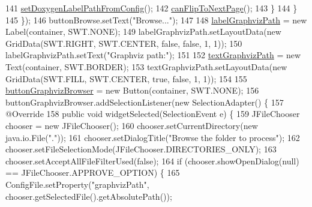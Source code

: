 \begin{DoxyCode}
141                     \hyperlink{classit_1_1isislab_1_1masonassisteddocumentation_1_1mason_1_1wizards_1_1_b___project_information_page_ad0acda6e90aee0af403c3e9c53525b5d}{setDoxygenLabelPathFromConfig}();
142                     \hyperlink{classit_1_1isislab_1_1masonassisteddocumentation_1_1mason_1_1wizards_1_1_b___project_information_page_a4ad2c0b1269d22b81ffc9e77f399c6af}{canFlipToNextPage}();
143                 \}
144             \}
145         \});
146         buttonBrowse.setText(\textcolor{stringliteral}{"Browse..."});
147         
148         \hyperlink{classit_1_1isislab_1_1masonassisteddocumentation_1_1mason_1_1wizards_1_1_b___project_information_page_acb48412dbb797258e13404c757c8d3f4}{labelGraphvizPath} = \textcolor{keyword}{new} Label(container, SWT.NONE);
149         labelGraphvizPath.setLayoutData(\textcolor{keyword}{new} GridData(SWT.RIGHT, SWT.CENTER, \textcolor{keyword}{false}, \textcolor{keyword}{false}, 1, 1));
150         labelGraphvizPath.setText(\textcolor{stringliteral}{"Graphviz path:"});
151         
152         \hyperlink{classit_1_1isislab_1_1masonassisteddocumentation_1_1mason_1_1wizards_1_1_b___project_information_page_a03d43e1fbcdb5d7d5e6745d8f57db84b}{textGraphvizPath} = \textcolor{keyword}{new} Text(container, SWT.BORDER);
153         textGraphvizPath.setLayoutData(\textcolor{keyword}{new} GridData(SWT.FILL, SWT.CENTER, \textcolor{keyword}{true}, \textcolor{keyword}{false}, 1, 1));
154         
155         \hyperlink{classit_1_1isislab_1_1masonassisteddocumentation_1_1mason_1_1wizards_1_1_b___project_information_page_ad5db74dd5c7fc084f538fde88d57573a}{buttonGraphvizBrowser} = \textcolor{keyword}{new} Button(container, SWT.NONE);
156         buttonGraphvizBrowser.addSelectionListener(\textcolor{keyword}{new} SelectionAdapter() \{
157             @Override
158             \textcolor{keyword}{public} \textcolor{keywordtype}{void} widgetSelected(SelectionEvent e) \{
159                 JFileChooser chooser = \textcolor{keyword}{new} JFileChooser();
160                 chooser.setCurrentDirectory(\textcolor{keyword}{new} java.io.File(\textcolor{stringliteral}{"."}));
161                 chooser.setDialogTitle(\textcolor{stringliteral}{"Browse the folder to process"});
162                 chooser.setFileSelectionMode(JFileChooser.DIRECTORIES\_ONLY);
163                 chooser.setAcceptAllFileFilterUsed(\textcolor{keyword}{false});
164                 \textcolor{keywordflow}{if} (chooser.showOpenDialog(null) == JFileChooser.APPROVE\_OPTION) \{                  
165                     ConfigFile.setProperty(\textcolor{stringliteral}{"graphvizPath"}, chooser.getSelectedFile().getAbsolutePath());

\end{DoxyCode}
